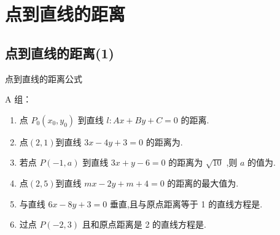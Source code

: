 \clearpage
\section*{点到直线的距离}
\subsection*{点到直线的距离(1)}

\zsd 点到直线的距离公式

A 组：

\begin{enumerate}
    \item 点 $P_0\left( x_0, y_0\right)$ 到直线 $l : Ax + By + C = 0$ 的距离.
    
    \item 点$(2,1)$到直线 ${3x} - {4y} + 3 = 0$ 的距离为.

    \item 若点 $P\left( {-1,a}\right)$ 到直线 ${3x} + y - 6 = 0$ 的距离为 $\sqrt{10}$ ,则 $a$ 的值为.
    
    \item 点$(2,5)$到直线 ${mx} - {2y} + m + 4 = 0$ 的距离的最大值为.
    
    \item 与直线 ${6x} - {8y} + 3 = 0$ 垂直,且与原点距离等于 1 的直线方程是.
    
    \item 过点 $P\left( {-2,3}\right)$ 且和原点距离是 2 的直线方程是.
\end{enumerate}

